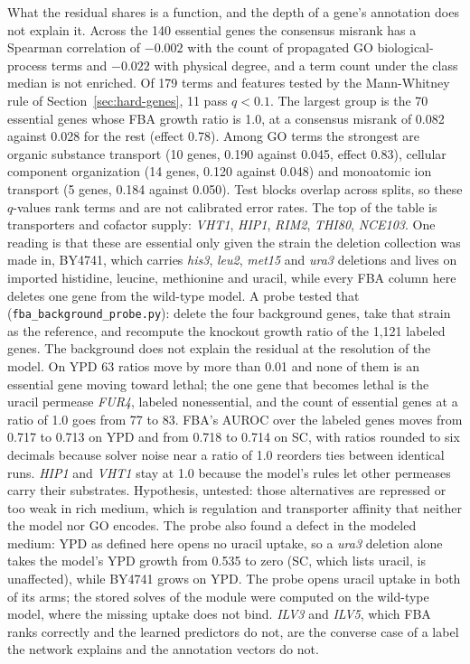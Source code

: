 What the residual shares is a function, and the depth of a gene's annotation does not
explain it. Across the 140 essential genes the consensus misrank has a Spearman
correlation of $-0.002$ with the count of propagated GO biological-process terms and
$-0.022$ with physical degree, and a term count under the class median is not
enriched. Of 179 terms and features tested by the Mann-Whitney rule of
Section~\ref{sec:hard-genes}, 11 pass $q < 0.1$. The largest group is the 70 essential
genes whose FBA growth ratio is 1.0, at a consensus misrank of 0.082 against 0.028 for
the rest (effect 0.78). Among GO terms the strongest are organic substance transport (10
genes, 0.190 against 0.045, effect 0.83), cellular component organization (14 genes,
0.120 against 0.048) and monoatomic ion transport (5 genes, 0.184 against 0.050). Test
blocks overlap across splits, so these $q$-values rank terms and are not calibrated error
rates. The top of the table is transporters and cofactor supply: \textit{VHT1},
\textit{HIP1}, \textit{RIM2}, \textit{THI80}, \textit{NCE103}. One reading is that these are essential only given the strain the deletion collection
was made in, BY4741, which carries \textit{his3}, \textit{leu2}, \textit{met15} and
\textit{ura3} deletions and lives on imported histidine, leucine, methionine and
uracil, while every FBA column here deletes one gene from the wild-type model. A probe
tested that (\texttt{fba\_background\_probe.py}): delete the four background genes,
take that strain as the reference, and recompute the knockout growth ratio of the 1,121
labeled genes. The background does not explain the residual at the resolution of the
model. On YPD 63 ratios move by more than 0.01 and none of them is an essential gene
moving toward lethal; the one gene that becomes lethal is the uracil permease
\textit{FUR4}, labeled nonessential, and the count of essential genes at a ratio of 1.0
goes from 77 to 83. FBA's AUROC over the labeled genes moves from 0.717 to 0.713 on YPD
and from 0.718 to 0.714 on SC, with ratios rounded to six decimals because solver noise
near a ratio of 1.0 reorders ties between identical runs. \textit{HIP1} and \textit{VHT1} stay at 1.0 because the
model's rules let other permeases carry their substrates. Hypothesis, untested: those
alternatives are repressed or too weak in rich medium, which is regulation and
transporter affinity that neither the model nor GO encodes. The probe also found a
defect in the modeled medium: YPD as defined here opens no uracil uptake, so a
\textit{ura3} deletion alone takes the model's YPD growth from 0.535 to zero (SC, which lists uracil, is unaffected), while
BY4741 grows on YPD. The probe opens uracil uptake in both of its arms; the stored
solves of the module were computed on the wild-type model, where the missing uptake
does not bind. \textit{ILV3} and \textit{ILV5}, which FBA ranks
correctly and the learned predictors do not, are the converse case of a label the
network explains and the annotation vectors do not.


